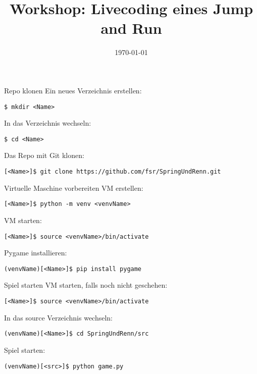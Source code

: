 



\title{Workshop: Livecoding eines Jump and Run}
\date{\today}



\maketitle


\begin{frame}[fragile]{Repo klonen}
 Ein neues Verzeichnis erstellen:
 \begin{lstlisting}
$ mkdir <Name>
 \end{lstlisting}
 
 In das Verzeichnis wechseln:
 \begin{lstlisting}
$ cd <Name>
 \end{lstlisting}

 Das Repo mit Git klonen:
 \begin{lstlisting}
[<Name>]$ git clone https://github.com/fsr/SpringUndRenn.git
 \end{lstlisting}
\end{frame}


\begin{frame}[fragile]{Virtuelle Maschine vorbereiten}
 VM erstellen:
 \begin{lstlisting}
[<Name>]$ python -m venv <venvName>
 \end{lstlisting}
 
 VM starten:
 \begin{lstlisting}
[<Name>]$ source <venvName>/bin/activate
 \end{lstlisting}

 Pygame installieren:
 \begin{lstlisting}
(venvName)[<Name>]$ pip install pygame
 \end{lstlisting}
\end{frame}


\begin{frame}[fragile]{Spiel starten}
 VM starten, falls noch nicht geschehen:
 \begin{lstlisting}
[<Name>]$ source <venvName>/bin/activate
 \end{lstlisting}

 In das source Verzeichnis wechseln:
 \begin{lstlisting}
(venvName)[<Name>]$ cd SpringUndRenn/src
 \end{lstlisting}
 
  Spiel starten:
 \begin{lstlisting}
(venvName)[<src>]$ python game.py
 \end{lstlisting}
\end{frame}



